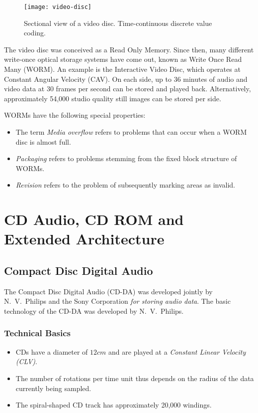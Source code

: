 \begin{figure}[ht!]
	\centering
	\texttt{[image: video-disc]}
	\caption[Sectional view of a video disc]{Sectional view of a video disc. Time-continuous discrete value coding.}{\label{fig:video-disc}}
\end{figure}

The video disc was conceived as a Read Only Memory. Since then, many different write-once optical storage systems have come out, known as Write Once Read Many (WORM). An example is the Interactive Video Disc, which operates at Constant Angular Velocity (CAV). On each side, up to 36 minutes of audio and video data at 30 frames per second can be stored and played back. Alternatively, approximately 54,000 studio quality still images can be stored per side.

WORMs have the following special properties:
\begin{itemize}
	\item The term \textit{Media overflow} refers to problems that can occur when a WORM disc is almost full.
	
	\item \textit{Packaging} refers to problems stemming from the fixed block structure of WORMs.
	
	\item \textit{Revision} refers to the problem of subsequently marking areas as invalid.
\end{itemize}

\section{CD Audio, CD ROM and Extended Architecture}
\subsection[CD Audio]{Compact Disc Digital Audio}
The Compact Disc Digital Audio (CD-DA) was developed jointly by N.\ V.\ Philips and the Sony Corporation \textit{for storing audio data}. The basic technology of the CD-DA was developed by N.\ V.\ Philips.

\subsubsection{Technical Basics}
\begin{itemize}
	\item CDs have a diameter of $ 12cm $ and are played at a \textit{Constant Linear Velocity (CLV)}.
	\item The number of rotations per time unit thus depends on the radius of the data currently being sampled. 
	\item The spiral-shaped CD track has approximately 20,000 windings.
\end{itemize}


